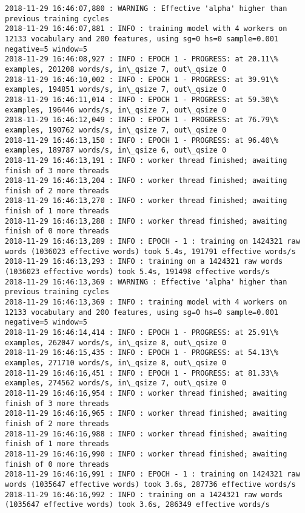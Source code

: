 \documentclass[11pt]{article}
\begin{document}
\begin{Verbatim}[commandchars=\\\{\}]
2018-11-29 16:46:07,880 : WARNING : Effective 'alpha' higher than previous training cycles
2018-11-29 16:46:07,881 : INFO : training model with 4 workers on 12133 vocabulary and 200 features, using sg=0 hs=0 sample=0.001 negative=5 window=5
2018-11-29 16:46:08,927 : INFO : EPOCH 1 - PROGRESS: at 20.11\% examples, 201208 words/s, in\_qsize 7, out\_qsize 0
2018-11-29 16:46:10,002 : INFO : EPOCH 1 - PROGRESS: at 39.91\% examples, 194851 words/s, in\_qsize 7, out\_qsize 0
2018-11-29 16:46:11,014 : INFO : EPOCH 1 - PROGRESS: at 59.30\% examples, 196446 words/s, in\_qsize 7, out\_qsize 0
2018-11-29 16:46:12,049 : INFO : EPOCH 1 - PROGRESS: at 76.79\% examples, 190762 words/s, in\_qsize 7, out\_qsize 0
2018-11-29 16:46:13,150 : INFO : EPOCH 1 - PROGRESS: at 96.40\% examples, 189787 words/s, in\_qsize 6, out\_qsize 0
2018-11-29 16:46:13,191 : INFO : worker thread finished; awaiting finish of 3 more threads
2018-11-29 16:46:13,204 : INFO : worker thread finished; awaiting finish of 2 more threads
2018-11-29 16:46:13,270 : INFO : worker thread finished; awaiting finish of 1 more threads
2018-11-29 16:46:13,288 : INFO : worker thread finished; awaiting finish of 0 more threads
2018-11-29 16:46:13,289 : INFO : EPOCH - 1 : training on 1424321 raw words (1036023 effective words) took 5.4s, 191791 effective words/s
2018-11-29 16:46:13,293 : INFO : training on a 1424321 raw words (1036023 effective words) took 5.4s, 191498 effective words/s
2018-11-29 16:46:13,369 : WARNING : Effective 'alpha' higher than previous training cycles
2018-11-29 16:46:13,369 : INFO : training model with 4 workers on 12133 vocabulary and 200 features, using sg=0 hs=0 sample=0.001 negative=5 window=5
2018-11-29 16:46:14,414 : INFO : EPOCH 1 - PROGRESS: at 25.91\% examples, 262047 words/s, in\_qsize 8, out\_qsize 0
2018-11-29 16:46:15,435 : INFO : EPOCH 1 - PROGRESS: at 54.13\% examples, 271710 words/s, in\_qsize 8, out\_qsize 0
2018-11-29 16:46:16,451 : INFO : EPOCH 1 - PROGRESS: at 81.33\% examples, 274562 words/s, in\_qsize 7, out\_qsize 0
2018-11-29 16:46:16,954 : INFO : worker thread finished; awaiting finish of 3 more threads
2018-11-29 16:46:16,965 : INFO : worker thread finished; awaiting finish of 2 more threads
2018-11-29 16:46:16,988 : INFO : worker thread finished; awaiting finish of 1 more threads
2018-11-29 16:46:16,990 : INFO : worker thread finished; awaiting finish of 0 more threads
2018-11-29 16:46:16,991 : INFO : EPOCH - 1 : training on 1424321 raw words (1035647 effective words) took 3.6s, 287736 effective words/s
2018-11-29 16:46:16,992 : INFO : training on a 1424321 raw words (1035647 effective words) took 3.6s, 286349 effective words/s

\end{Verbatim}
\end{document}
